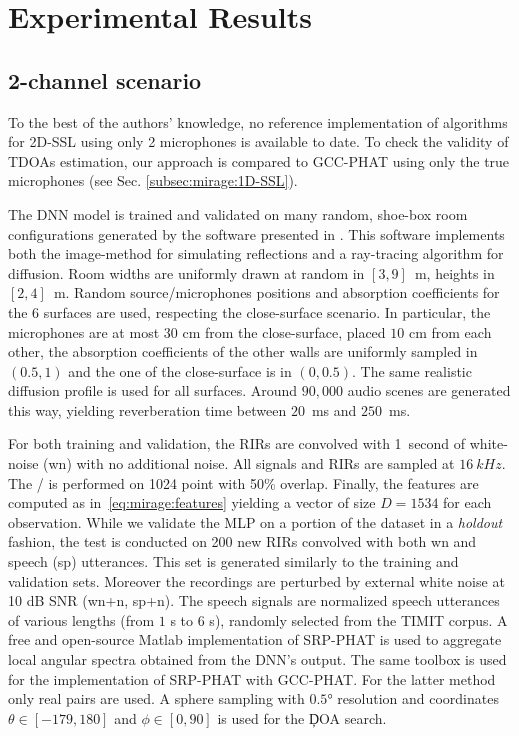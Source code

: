 \section{Experimental Results}\label{sec:mirage:exp}

\subsection{2-channel scenario}
To the best of the authors' knowledge, no reference implementation of algorithms for 2D-SSL using only 2 microphones is available to date.
To check the validity of \ac{TDOA}s estimation, our approach is compared to \ac{GCC-PHAT} using only the true microphones (see Sec. \cref{subsec:mirage:1D-SSL}).

\mynewline
The \ac{DNN} model is trained and validated on many random, shoe-box room configurations generated by the software presented in .
This software implements both the image-method for simulating reflections and a ray-tracing algorithm for diffusion.
Room widths are uniformly drawn at random in $[3, 9]$~m, heights in $[2, 4]$~m.
Random source/microphones positions and absorption coefficients for the 6 surfaces are used,
respecting the close-surface scenario. In particular, the microphones are at most $30$ cm from the close-surface,
placed $10$ cm from each other, the absorption coefficients of the other walls are
uniformly sampled in $(0.5, 1)$ and the one of the close-surface is in $(0, 0.5)$.
The same realistic diffusion profile  is used for all surfaces.
Around $90,000$ audio scenes are generated this way, yielding reverberation time \RT{} between $20$~ms and $250$~ms.

\mynewline
For both training and validation, the \acp{RIR} are convolved with 1~second of white-noise (wn) with no additional noise.
All signals and RIRs are sampled at $\SI{16}{kHz}$.
The \STFT/ is performed on 1024 point with 50\% overlap.
Finally, the features are computed as in~\eqref{eq:mirage:features} yielding a vector of size $D = 1534$ for each observation.
While we validate the MLP on a portion of the dataset in a \textit{holdout} fashion, the test is conducted on 200 new \acp{RIR} convolved with both wn and speech (sp) utterances.
This set is generated similarly to the training and validation sets. Moreover the recordings are perturbed by external white noise at 10 dB SNR (wn+n, sp+n).
The speech signals are normalized speech utterances of various lengths (from $1$ s to $6$ s), randomly selected from the TIMIT corpus.
A free and open-source Matlab implementation of \ac{SRP-PHAT} is used to aggregate local angular spectra obtained from the \ac{DNN}'s output.
The same toolbox is used for the implementation of \ac{SRP-PHAT} with \ac{GCC-PHAT}.
For the latter method only real pairs are used.
A sphere sampling with $\ang{0.5}$ resolution and coordinates $\theta \in [-179, 180]$ and $\phi \in [0, 90]$ is used for the \c{DOA} search.


